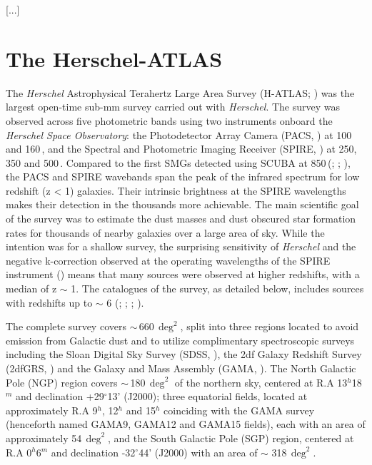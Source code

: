 [...]

\section{The Herschel-ATLAS}
\label{sec:The Herschel-ATLAS}

The \textit{Herschel} Astrophysical Terahertz Large Area Survey (H-ATLAS; \citealt{Eales_2010}) was the largest open-time sub-mm survey carried out with \textit{Herschel}. The survey was observed across five photometric bands using two instruments onboard the \textit{Herschel Space Observatory}: the Photodetector Array Camera (PACS, \citealt{Poglitsch_2010}) at 100 and 160\,\micron, and the Spectral and Photometric Imaging Receiver (SPIRE, \citealt{Griffin_2010}) at 250, 350 and 500\,\micron. Compared to the first SMGs detected using SCUBA at 850\,\micron (\citealt{Smail_1997}; \citealt{Barger_1998}; \citealt{Hughes_1998}), the PACS and SPIRE wavebands span the peak of the infrared spectrum for low redshift (z < 1) galaxies. Their intrinsic brightness at the SPIRE wavelengths makes their detection in the thousands more achievable. The main scientific goal of the survey was to estimate the dust masses and dust obscured star formation rates for thousands of nearby galaxies over a large area of sky. While the intention was for a shallow survey, the surprising sensitivity of \textit{Herschel} and the negative k-correction observed at the operating wavelengths of the SPIRE instrument (\citealt{Blain_1993}) means that many sources were observed at higher redshifts, with a median of z $\sim$ 1. The catalogues of the survey, as detailed below, includes sources with redshifts up to $\sim$ 6 (\citealt{Amblard_2010}; \citealt{Lapi_2011}; \citealt{Fudamoto_2017}; \citealt{Zavala_2018}).

The complete survey covers $\sim$\,660\,$\deg^2$, split into three regions located to avoid emission from Galactic dust and to utilize complimentary spectroscopic surveys including the Sloan Digital Sky Survey (SDSS, \citealt{York_2000}), the 2df Galaxy Redshift Survey (2dfGRS, \citealt{Colless_2001}) and the Galaxy and Mass Assembly (GAMA, \citealt{Driver_2009}). The North Galactic Pole (NGP) region covers $\sim$\,180\,$\deg^2$ of the northern sky, centered at R.A 13$^{h}$18$^{m}$ and declination +29$^{\circ}$13' (J2000); three equatorial fields, located at approximately R.A 9$^{h}$, 12$^{h}$ and 15$^{h}$ coinciding with the GAMA survey (henceforth named GAMA9, GAMA12 and GAMA15 fields), each with an area of approximately 54\,$\deg^2$, and the South Galactic Pole (SGP) region, centered at R.A 0$^{h}$6$^{m}$ and declination -32$^{\circ}$44' (J2000) with an area of $\sim$ 318\,$\deg^2$. 

